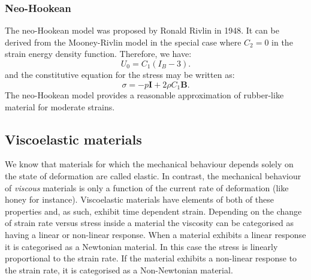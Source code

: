 	\subsubsection*{Neo-Hookean}			
The neo-Hookean model was proposed by Ronald Rivlin in 1948. It can be derived from the Mooney-Rivlin model in the special case where $C_2 = 0$ in the strain energy density function. Therefore, we have:
\begin{equation}
U_0 = C_1 (I_B-3).
\end{equation}
and the constitutive equation for the stress may be written as:
\begin{equation}
\sigma = -p \mathbf{I} + 2 \rho C_1 \mathbf{B}.
\end{equation}
The neo-Hookean model provides a reasonable approximation of rubber-like material for moderate strains.
			
			
	\subsection{Viscoelastic materials}
\ON We know that materials for which the mechanical behaviour depends solely on the state of deformation are called elastic. In contrast, the mechanical behaviour of \emph{viscous} materials is only a function of the current rate of deformation (like honey for instance). \OFF Viscoelastic materials have elements of both of these properties and, as such, exhibit time dependent strain. Depending on the change of strain rate versus stress inside a material the viscosity can be categorised as having a linear or non-linear response. When a material exhibits a linear response it is categorised as a Newtonian material. In this case the stress is linearly proportional to the strain rate. If the material exhibits a non-linear response to the strain rate, it is categorised as a Non-Newtonian material. 

